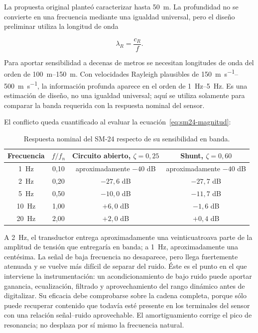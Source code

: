 La propuesta original planteó caracterizar hasta \SI{50}{\meter}. La profundidad no se
convierte en una frecuencia mediante una igualdad universal, pero el diseño preliminar
utiliza la longitud de onda

\begin{equation}
    \lambda_R=\frac{c_R}{f}.
\end{equation}

Para aportar sensibilidad a decenas de metros se necesitan longitudes de onda del orden
de \SIrange{100}{150}{\meter}. Con velocidades Rayleigh plausibles de
\SIrange{150}{500}{\meter\per\second}, la información profunda aparece en el orden de
\SIrange{1}{5}{\hertz}. Es una estimación de diseño, no una igualdad universal; aquí se
utiliza solamente para comparar la banda requerida con la respuesta nominal del sensor.

El conflicto queda cuantificado al evaluar la ecuación~\eqref{eq:sm24-magnitud}:

\begin{table}[ht]
\centering
\small
\caption{Respuesta nominal del SM-24 respecto de su sensibilidad en banda.}
\begin{tabular}{@{}cccc@{}}
\toprule
\textbf{Frecuencia} & $f/f_n$ & \textbf{Circuito abierto, $\zeta=0{,}25$} & \textbf{Shunt, $\zeta=0{,}60$} \\
\midrule
\SI{1}{\hertz}  & 0,10 & aproximadamente $-40$ dB & aproximadamente $-40$ dB \\
\SI{2}{\hertz}  & 0,20 & $-27{,}6$ dB & $-27{,}7$ dB \\
\SI{5}{\hertz}  & 0,50 & $-10{,}0$ dB & $-11{,}7$ dB \\
\SI{10}{\hertz} & 1,00 & $+6{,}0$ dB & $-1{,}6$ dB \\
\SI{20}{\hertz} & 2,00 & $+2{,}0$ dB & $+0{,}4$ dB \\
\bottomrule
\end{tabular}
\end{table}

A \SI{2}{\hertz}, el transductor entrega aproximadamente una veinticuatroava parte de
la amplitud de tensión que entregaría en banda; a \SI{1}{\hertz}, aproximadamente una
centésima. La señal de baja frecuencia no desaparece, pero llega fuertemente atenuada y
se vuelve más difícil de separar del ruido. Éste es el punto en el que interviene la
instrumentación: un acondicionamiento de bajo ruido puede aportar ganancia, ecualización,
filtrado y aprovechamiento del rango dinámico antes de digitalizar. Su eficacia debe
comprobarse sobre la cadena completa, porque sólo puede recuperar contenido que todavía
esté presente en los terminales del sensor con una relación señal--ruido aprovechable. El
amortiguamiento corrige el pico de resonancia; no desplaza por sí mismo la frecuencia
natural.

